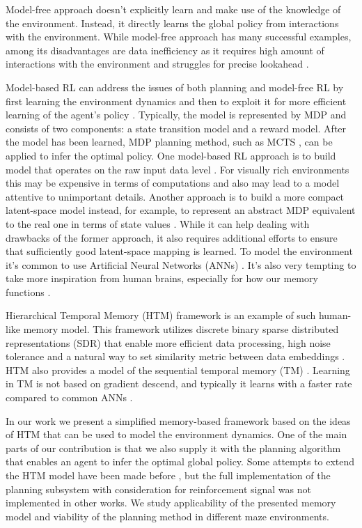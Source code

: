 \documentclass[a4paper,twoside]{article}
\begin{document}
Model-free approach doesn't explicitly learn and make use of the knowledge of the environment. Instead, it directly learns the global policy from interactions with the environment. While model-free approach has many successful examples, among its disadvantages are data inefficiency as it requires high amount of interactions with the environment and struggles for precise lookahead \cite{Mnih_2015_Atari,haarnoja_2018_sac,schulman_2017_ppo}.

Model-based RL can address the issues of both planning and model-free RL by first learning the environment dynamics and then to exploit it for more efficient learning of the agent's policy \cite{moerland_2020_modelbased}. Typically, the model is represented by MDP and consists of two components: a state transition model and a reward model. After the model has been learned, MDP planning method, such as MCTS \cite{Coulom_2007_mcts}, can be applied to infer the optimal policy. One model-based RL approach is to build model that operates on the raw input data level \cite{Gorodetskiy2020,kaiser_2020_modelbased}. For visually rich environments this may be expensive in terms of computations and also may lead to a model attentive to unimportant details. Another approach is to build a more compact latent-space model instead, for example, to represent an abstract MDP equivalent to the real one in terms of state values \cite{silver_2020_muzero}. While it can help dealing with drawbacks of the former approach, it also requires additional efforts to ensure that sufficiently good latent-space mapping is learned. To model the environment it's common to use Artificial Neural Networks (ANNs) \cite{silver_2020_muzero,Ha_Schmidhuber_2018_worldmodels}. It's also very tempting to take more inspiration from human brains, especially for how our memory functions \cite{Hassabis_2017_neuro}.

Hierarchical Temporal Memory (HTM) framework \cite{George_Hawkins_2009} is an example of such human-like memory model. This framework utilizes discrete binary sparse distributed representations (SDR) that enable more efficient data processing, high noise tolerance and a natural way to set similarity metric between data embeddings \cite{Cui_Ahmad_Hawkins_2017_sdr}. HTM also provides a model of the sequential temporal memory (TM) \cite{hawkins_TM,Ahmad_Lavin_2017_data_streams}. Learning in TM is not based on gradient descend, and typically it learns with a faster rate compared to common ANNs \cite{Cui_Ahmad_Hawkins_2016_seq_learn}.

In our work we present a simplified memory-based framework based on the ideas of HTM that can be used to model the environment dynamics. One of the main parts of our contribution is that we also supply it with the planning algorithm that enables an agent to infer the optimal global policy. Some attempts to extend the HTM model have been made before \cite{Skrynnik2016,Daylidyonok2018,Nugamanov2020}, but the full implementation of the planning subsystem with consideration for reinforcement signal was not implemented in other works. We study applicability of the presented memory model and viability of the planning method in different maze environments.
\end{document}
